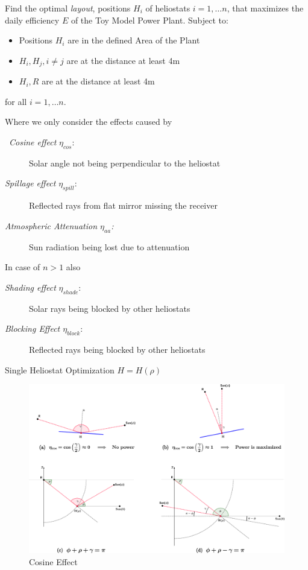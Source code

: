\documentclass[10pt, xcolor={dvipsnames}]{beamer}
\begin{document}
\begin{frame}
\begin{definition}
Find the optimal {\it layout}, positions $H_{i}$ of heliostats $i = 1, \dots n$, that maximizes the daily efficiency $E$ of the Toy Model Power Plant. Subject to: 
\begin{itemize}
\item Positions $H_{i}$ are in the defined Area of the Plant
\item $H_{i}, H_{j}, i\neq j$ are at the distance at least 4m
\item $H_{i}, R$ are at the distance at least 4m
\end{itemize}
for all $i = 1,\dots n$.
\end{definition}
\vspace{.5cm}
Where we only consider the effects caused by
\begin{description}
\item[\, {\it Cosine effect} $\eta_{cos}:$] Solar angle not being perpendicular to the heliostat 
\item[\; {\it Spillage effect} $\eta_{spill}:$] Reflected rays from flat mirror missing the receiver
\item[\; {\it Atmospheric Attenuation $\eta_{aa}$:}] Sun radiation being lost due to attenuation
\end{description}
\vspace{.5cm}
In case of $n > 1$ also
\begin{description}
\item[\; {\it Shading effect} $\eta_{shade}:$] Solar rays being blocked by other heliostats
\item[\; {\it Blocking Effect $\eta_{block}:$}] Reflected rays being blocked by other heliostats
\end{description}
\end{frame}

\begin{frame}{Single Heliostat Optimization $H = H(\rho)$}
\begin{center}
\begin{figure}
\includegraphics[width=.95\textwidth]{../figures/cos-effect-crop.pdf}
\caption{Cosine Effect}
\end{figure}
\end{center}
\end{frame}
\end{document}
